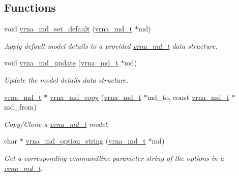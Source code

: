 \subsection*{Functions}
\begin{DoxyCompactItemize}
\item 
void \hyperlink{group__model__details_ga8ac6ff84936282436f822644bf841f66}{vrna\+\_\+md\+\_\+set\+\_\+default} (\hyperlink{group__model__details_ga1f8a10e12a0a1915f2a4eff0b28ea17c}{vrna\+\_\+md\+\_\+t} $\ast$md)
\begin{DoxyCompactList}\small\item\em Apply default model details to a provided \hyperlink{group__model__details_ga1f8a10e12a0a1915f2a4eff0b28ea17c}{vrna\+\_\+md\+\_\+t} data structure. \end{DoxyCompactList}\item 
void \hyperlink{group__model__details_ga36ae40b8c3b82362f5798ad5b047b814}{vrna\+\_\+md\+\_\+update} (\hyperlink{group__model__details_ga1f8a10e12a0a1915f2a4eff0b28ea17c}{vrna\+\_\+md\+\_\+t} $\ast$md)
\begin{DoxyCompactList}\small\item\em Update the model details data structure. \end{DoxyCompactList}\item 
\hyperlink{group__model__details_ga1f8a10e12a0a1915f2a4eff0b28ea17c}{vrna\+\_\+md\+\_\+t} $\ast$ \hyperlink{group__model__details_ga619057a740918b5fb01808362bb67aea}{vrna\+\_\+md\+\_\+copy} (\hyperlink{group__model__details_ga1f8a10e12a0a1915f2a4eff0b28ea17c}{vrna\+\_\+md\+\_\+t} $\ast$md\+\_\+to, const \hyperlink{group__model__details_ga1f8a10e12a0a1915f2a4eff0b28ea17c}{vrna\+\_\+md\+\_\+t} $\ast$md\+\_\+from)
\begin{DoxyCompactList}\small\item\em Copy/\+Clone a \hyperlink{group__model__details_ga1f8a10e12a0a1915f2a4eff0b28ea17c}{vrna\+\_\+md\+\_\+t} model. \end{DoxyCompactList}\item 
char $\ast$ \hyperlink{group__model__details_ga3a7469f0725a849af6ba61a57dfd60ce}{vrna\+\_\+md\+\_\+option\+\_\+string} (\hyperlink{group__model__details_ga1f8a10e12a0a1915f2a4eff0b28ea17c}{vrna\+\_\+md\+\_\+t} $\ast$md)
\begin{DoxyCompactList}\small\item\em Get a corresponding commandline parameter string of the options in a \hyperlink{group__model__details_ga1f8a10e12a0a1915f2a4eff0b28ea17c}{vrna\+\_\+md\+\_\+t}. \end{DoxyCompactList}\item 

\end{DoxyCompactItemize}
